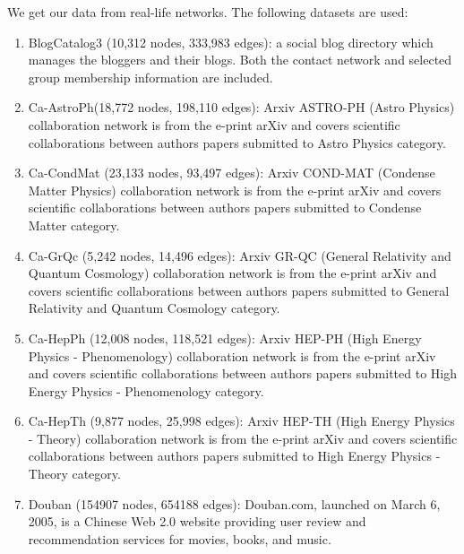 We get our data from real-life networks\cite{datasets1}\cite{datasets2}. The following datasets are used:
\begin{enumerate}
	\item BlogCatalog3 (10,312 nodes, 333,983 edges): a social blog directory which manages the bloggers and their blogs. Both the contact network and selected group membership information are included.
	\item Ca-AstroPh(18,772 nodes, 198,110 edges): Arxiv ASTRO-PH (Astro Physics) collaboration network is from the e-print arXiv and covers scientific collaborations between authors papers submitted to Astro Physics category.
	\item Ca-CondMat (23,133 nodes, 93,497 edges): Arxiv COND-MAT (Condense Matter Physics) collaboration network is from the e-print arXiv and covers scientific collaborations between authors papers submitted to Condense Matter category.
	\item Ca-GrQc (5,242 nodes, 14,496 edges): Arxiv GR-QC (General Relativity and Quantum Cosmology) collaboration network is from the e-print arXiv and covers scientific collaborations between authors papers submitted to General Relativity and Quantum Cosmology category. 
	\item Ca-HepPh (12,008 nodes, 118,521 edges): Arxiv HEP-PH (High Energy Physics - Phenomenology) collaboration network is from the e-print arXiv and covers scientific collaborations between authors papers submitted to High Energy Physics - Phenomenology category.
	\item Ca-HepTh (9,877 nodes, 25,998 edges): Arxiv HEP-TH (High Energy Physics - Theory) collaboration network is from the e-print arXiv and covers scientific collaborations between authors papers submitted to High Energy Physics - Theory category. 
	\item Douban (154907 nodes, 654188 edges):
	 Douban.com, launched on March 6, 2005, is a Chinese Web 2.0 website providing user review and recommendation services for movies, books, and music.
\end{enumerate}

